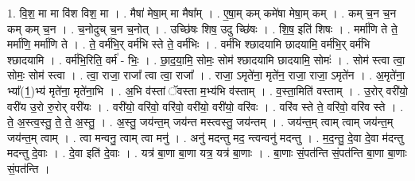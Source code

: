 \documentclass[17pt]{extarticle}
\begin{document}
1. वि॒श॒ मा मा वि॑श विश॒ मा । . मैषा॑ मेषा॒म् मा मैषा᳚म् । . ए॒षा॒म् कम् कमे॑षा मेषा॒म् कम् । . कम् च॒न च॒न कम् कम् च॒न । . च॒नोदुच् च॒न च॒नोत् । . उच्छि॑षः शिष॒ उदु च्छि॑षः । . शि॒ष॒ इति॑ शिषः । . मर्मा॑णि ते ते॒ मर्मा॑णि॒ मर्मा॑णि ते । . ते॒ वर्म॑भि॒र् वर्म॑भि स्ते ते॒ वर्म॑भिः । . वर्म॑भि श्छादयामि छादयामि॒ वर्म॑भि॒र् वर्म॑भि श्छादयामि । . वर्म॑भि॒रिति॒ वर्म॑ - भिः॒ । . छा॒द॒या॒मि॒ सोमः॒ सोम॑ श्छादयामि छादयामि॒ सोमः॑ । . सोम॑ स्त्वा त्वा॒ सोमः॒ सोम॑ स्त्वा । . त्वा॒ राजा॒ राजा᳚ त्वा त्वा॒ राजा᳚ । . राजा॒ ऽमृते॑ना॒ मृते॑न॒ राजा॒ राजा॒ ऽमृते॑न । . अ॒मृते॑ना॒ भ्या᳚(1॒)भ्य॑ मृते॑ना॒ मृते॑ना॒भि । . अ॒भि व॑स्तां ॅवस्ता म॒भ्य॑भि व॑स्ताम् । . व॒स्ता॒मिति॑ वस्ताम् । . उ॒रोर् वरी॑यो॒ वरी॑य उ॒रो रु॒रोर् वरी॑यः । . वरी॑यो॒ वरि॑वो॒ वरि॑वो॒ वरी॑यो॒ वरी॑यो॒ वरि॑वः । . वरि॑व स्ते ते॒ वरि॑वो॒ वरि॑व स्ते । . ते॒ अ॒स्त्व॒स्तु॒ ते॒ ते॒ अ॒स्तु॒ । . अ॒स्तु॒ जय॑न्त॒म् जय॑न्त मस्त्वस्तु॒ जय॑न्तम् । . जय॑न्त॒म् त्वाम् त्वाम् जय॑न्त॒म् जय॑न्त॒म् त्वाम् । . त्वा मन्वनु॒ त्वाम् त्वा मनु॑ । . अनु॑ मदन्तु मद॒ न्त्वन्वनु॑ मदन्तु । . म॒द॒न्तु॒ दे॒वा दे॒वा म॑दन्तु मदन्तु दे॒वाः । . दे॒वा इति॑ दे॒वाः । . यत्र॑ बा॒णा बा॒णा यत्र॒ यत्र॑ बा॒णाः । . बा॒णाः सं॒पत॑न्ति सं॒पत॑न्ति बा॒णा बा॒णाः सं॒पत॑न्ति । \newline
\end{document}
